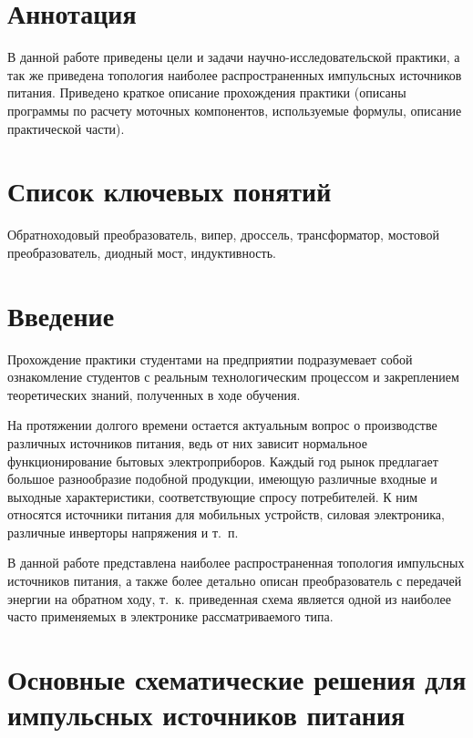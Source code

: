 


\setcounter{page}{3}

\section*{Аннотация}

В данной работе приведены цели и задачи научно-исследовательской практики, а так
же приведена топология наиболее распространенных импульсных источников питания.
Приведено краткое описание прохождения практики (описаны программы по расчету
моточных компонентов, используемые формулы, описание практической части).

\section*{Список ключевых понятий}

Обратноходовый преобразователь, випер, дроссель, трансформатор, мостовой
преобразователь, диодный мост, индуктивность.

\newpage

\tableofcontents
\newpage

\section*{Введение}

Прохождение практики студентами на предприятии подразумевает собой ознакомление
студентов с реальным технологическим процессом и закреплением теоретических
знаний, полученных в ходе обучения.

На протяжении долгого времени остается актуальным вопрос о производстве
различных источников питания, ведь от них зависит нормальное функционирование
бытовых электроприборов. Каждый год рынок предлагает большое разнообразие
подобной продукции, имеющую различные входные и выходные характеристики,
соответствующие спросу потребителей. К ним относятся источники питания для
мобильных устройств, силовая электроника, различные инверторы напряжения и т.~п.

В данной работе представлена наиболее распространенная топология импульсных
источников питания, а также более детально описан преобразователь с передачей
энергии на обратном ходу, т.~к. приведенная схема является одной из наиболее
часто применяемых в электронике рассматриваемого типа.
\newpage

\section{Основные схематические решения для импульсных источников питания}

